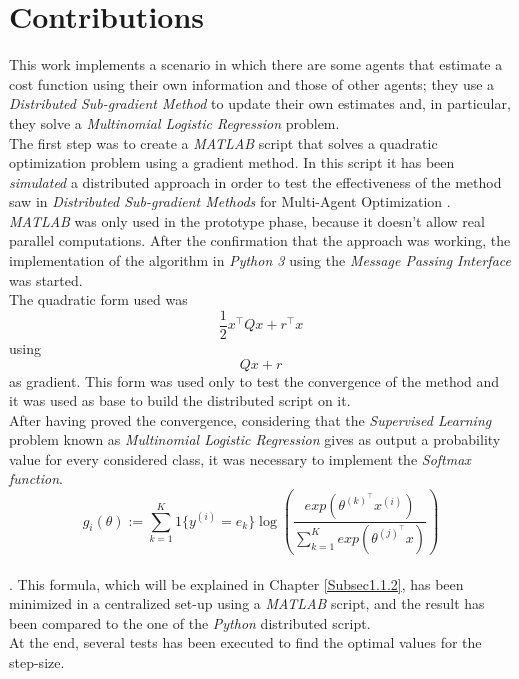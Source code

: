 \documentclass[a4paper,11pt,oneside]{book}
\begin{document}
\section*{Contributions}
This work implements a scenario in which there are some agents that estimate a cost function using their own information and those of other agents; they use a \textit{Distributed Sub-gradient Method} to update their own estimates and, in particular, they solve a \textit{Multinomial Logistic Regression} problem.\\

The first step was to create a \textit{MATLAB} script that solves a quadratic optimization problem using a gradient method. In this script it has been \textit{simulated} a distributed approach in order to test the effectiveness of the method saw in \textit{Distributed Sub-gradient Methods} for Multi-Agent Optimization \cite{CITATION:1}. \textit{MATLAB} was only used in the prototype phase, because it doesn't allow real parallel computations. After the confirmation that the approach was working, the implementation of the algorithm in \textit{Python 3} using the \textit{Message Passing Interface} was started.\\
The quadratic form used was 
\begin{equation} \tag{I}
\dfrac{1}{2}x^{\top}Qx + r^{\top}x
\end{equation}
using
\begin{equation} \tag{II}
	Qx + r
\end{equation}
as gradient. This form was used only to test the convergence of the method and it was used as base to build the distributed script on it.\\
After having proved the convergence, considering that the \textit{Supervised Learning} problem known as \textit{Multinomial Logistic Regression} gives as output a probability value for every considered class, it was necessary to implement the \textit{Softmax function}. 
\begin{equation} \tag{III}
g_i\left(\theta\right):=\sum_{k=1}^{K}{1\{y^{(i)}=e_k\}\log{\left( \frac{exp(\theta^{(k)^\top}x^{(i)})}{\sum_{k=1}^{K}{exp( \theta^{(j)^\top}x )}} \right)}}
\end{equation} \\
\cite{CITATION:3}. This formula, which will be explained in Chapter \ref{Subsec1.1.2}, has been minimized in a centralized set-up using a \textit{MATLAB} script, and the result has been compared to the one of the \textit{Python} distributed script.\\
At the end, several tests has been executed to find the optimal values for the step-size.\\
\end{document}
